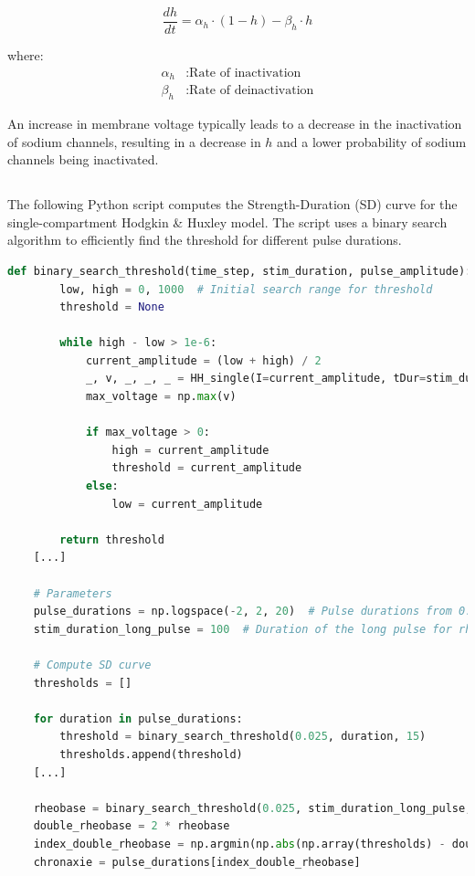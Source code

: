 \documentclass{article}
\begin{document}
    \[ \frac{dh}{dt} = \alpha_h \cdot (1 - h) - \beta_h \cdot h \]

    where:
    \begin{align*}
        \alpha_h & : \text{Rate of inactivation} \\
        \beta_h & : \text{Rate of deinactivation}
    \end{align*}

    An increase in membrane voltage typically leads to a decrease in the inactivation of sodium channels, resulting in a decrease in \(h\) and a lower probability of sodium channels being inactivated.

    \subsection{}

    The following Python script computes the Strength-Duration (SD) curve for the single-compartment Hodgkin \& Huxley model.
    The script uses a binary search algorithm to efficiently find the threshold for different pulse durations.

    \begin{lstlisting}[language=Python, style=mystyle]
    def binary_search_threshold(time_step, stim_duration, pulse_amplitude):
        low, high = 0, 1000  # Initial search range for threshold
        threshold = None

        while high - low > 1e-6:
            current_amplitude = (low + high) / 2
            _, v, _, _, _ = HH_single(I=current_amplitude, tDur=stim_duration)
            max_voltage = np.max(v)

            if max_voltage > 0:
                high = current_amplitude
                threshold = current_amplitude
            else:
                low = current_amplitude

        return threshold
    [...]

    # Parameters
    pulse_durations = np.logspace(-2, 2, 20)  # Pulse durations from 0.01 to 100 ms in 20 logarithmic steps
    stim_duration_long_pulse = 100  # Duration of the long pulse for rheobase calculation

    # Compute SD curve
    thresholds = []

    for duration in pulse_durations:
        threshold = binary_search_threshold(0.025, duration, 15)
        thresholds.append(threshold)
    [...]

    rheobase = binary_search_threshold(0.025, stim_duration_long_pulse, 15)
    double_rheobase = 2 * rheobase
    index_double_rheobase = np.argmin(np.abs(np.array(thresholds) - double_rheobase))
    chronaxie = pulse_durations[index_double_rheobase]
    \end{lstlisting}
\end{document}
